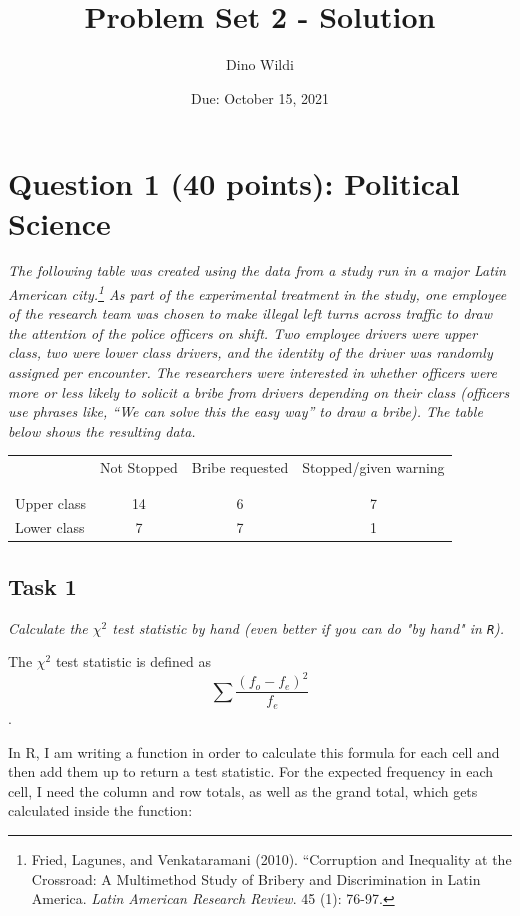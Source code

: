 \documentclass[12pt,a4paper]{article}
\title{Problem Set 2 - Solution}
\date{Due: October 15, 2021}
\author{Dino Wildi}
\begin{document}
\maketitle

\section*{Question 1 (40 points): Political Science}
\vspace{.25cm}
\textit{The following table was created using the data from a study run in a major Latin American city.\footnote{Fried, Lagunes, and Venkataramani (2010). ``Corruption and Inequality at the Crossroad: A Multimethod Study of Bribery and Discrimination in Latin America. \textit{Latin American Research Review}. 45 (1): 76-97.} As part of the experimental treatment in the study, one employee of the research team was chosen to make illegal left turns across traffic to draw the attention of the police officers on shift. Two employee drivers were upper class, two were lower class drivers, and the identity of the driver was randomly assigned per encounter. The researchers were interested in whether officers were more or less likely to solicit a bribe from drivers depending on their class (officers use phrases like, ``We can solve this the easy way'' to draw a bribe). The table below shows the resulting data.}

\begin{table}[h!]
	\centering
	\begin{tabular}{l | c c c }
		& Not Stopped & Bribe requested & Stopped/given warning \\
		\\[-1.8ex] 
		\hline \\[-1.8ex]
		Upper class & 14 & 6 & 7 \\
		Lower class & 7 & 7 & 1 \\
		\hline
	\end{tabular}
\end{table}

\subsection*{Task 1}
\textit{Calculate the $\chi^2$ test statistic by hand (even better if you can do "by hand" in \texttt{R}).\\}

The $\chi^2$ test statistic is defined as 
\[\sum\frac{(f_{o}-f_{e})^2}{f_{e}}\].

\noindent In R, I am writing a function in order to calculate this formula for each cell and then add them up to return a test statistic. For the expected frequency in each cell, I need the column and row totals, as well as the grand total, which gets calculated inside the function:
\end{document}
